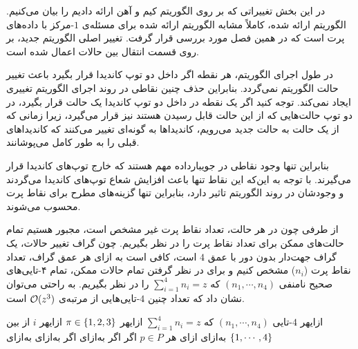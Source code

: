 
در این بخش تغییراتی که بر روی الگوریتم کیم و آهن ارائه دادیم را بیان می‌کنیم.
الگوریتم ارائه شده، کاملاً مشابه الگوریتم ارائه شده برای مسئله‌ی $1$-مرکز با داده‌های پرت است که در همین فصل مورد بررسی قرار گرفت.
تغییر اصلی الگوریتم جدید، بر روی قسمت انتقال بین حالات اعمال شده است. 

در طول اجرای الگوریتم، هر نقطه اگر داخل دو توپ کاندیدا قرار بگیرد باعث تغییر حالت الگوریتم نمی‌گردد.
بنابراین حذف چنین نقاطی در روند اجرای الگوریتم تغییری ایجاد نمی‌کند.
توجه کنید اگر یک نقطه در داخل دو توپ کاندیدا یک حالت قرار بگیرد، در دو توپ حالت‌هایی که از این حالت قابل رسیدن هستند نیز قرار می‌گیرد، زیرا زمانی که از یک حالت به حالت جدید می‌رویم، کاندیداها به گونه‌ای تغییر می‌کنند که کاندیداهای قبلی را به طور کامل می‌پوشانند.

بنابراین تنها وجود نقاطی در جویبارداده مهم هستند که خارج توپ‌های کاندیدا قرار می‌گیرند.
با توجه به این‌که این نقاط تنها باعث افزایش شعاع توپ‌های کاندیدا می‌گردند و وجودشان در روند الگوریتم تاثیر دارد، بنابراین تنها گزینه‌های مطرح برای نقاط پرت محسوب می‌شوند. 

از طرفی چون در هر حالت، تعداد نقاط پرت غیر مشخص است، مجبور هستیم تمام حالت‌های ممکن برای تعداد نقاط پرت را در نظر بگیریم.
چون گراف تغییر حالات، یک گراف جهت‌دار بدون دور با عمق $4$ است، کافی است به ازای هر عمق گراف، تعداد نقاط پرت ($n_i$) مشخص کنیم و برای در نظر گرفتن تمام حالات ممکن، تمام ۴‌-تایی‌های صحیح نامنفی $(n_1, \cdots, n_4)$ که $\sum_{i =1}^{4} n_i = z$ را در نظر بگیریم.
به راحتی می‌توان نشان داد که تعداد چنین $4$-تایی‌هایی از مرتبه‌ی $\mathcal{O}(z^3)$ است.

‌ازای{هر $4$-تایی $(n_1, \cdots, n_4)$ که $\sum_{i=1}^4 n_i = z$}
‌ازای{هر $\pi \in \left\{ 1, 2, 3 \right\}$}
‌ازای{هر $i$ از بین $\left\{ 1, \cdots, 4 \right\}$}
‌به‌ازای{}
‌ازای{ هر $p \in P$}
‌اگر{}
‌اگر{}
‌به‌ازای{}
‌اگر{}
‌به‌ازای{}
‌به‌ازای{}

